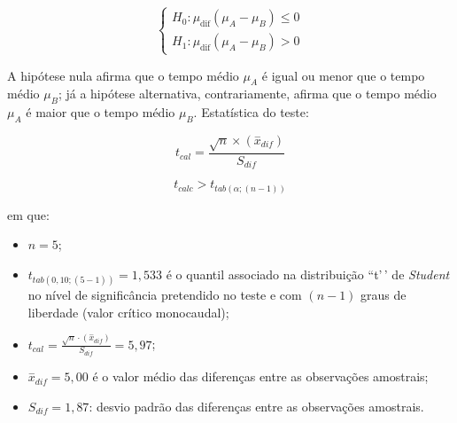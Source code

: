 \documentclass[
]{book}
\providecommand{\tightlist}{%
  \setlength{\itemsep}{0pt}\setlength{\parskip}{0pt}}
\begin{document}
\[
\begin{cases}
        H_{0}:  \mu_{\text{dif}} (\mu_{A} - \mu_{B}) \le 0 \\
        H_{1}:  \mu_{\text{dif}} (\mu_{A} - \mu_{B}) > 0
\end{cases}
\]

\hfill\break

A hipótese nula afirma que o tempo médio \(\mu_{A}\) é igual ou menor que o tempo médio \(\mu_{B}\); já a hipótese alternativa, contrariamente, afirma que o tempo médio \(\mu_{A}\) é maior que o tempo médio \(\mu_{B}\). Estatística do teste:

\hfill\break

\[
t_{cal} = \frac{\sqrt{n} \times \left({\stackrel{-}{x}}_{dif}\right)}{{S}_{dif}}
\]

\hfill\break

\[
t_{calc}  >  {t}_{tab\left(\alpha ; (n-1)\right)}
\]

\hfill\break

em que:

\hfill\break

\begin{itemize}
\tightlist
\item
  \(n=5\);\\
\item
  \({t}_{tab\left(0,10 ; (5-1) \right)} = 1,533\) é o quantil associado na distribuição ``t'\,' de \emph{Student} no nível de significância pretendido no teste e com \((n-1)\) graus de liberdade (valor crítico monocaudal);\\
\item
  \(t_{cal} = \frac{\sqrt{n}\cdot \left({\stackrel{-}{x}}_{dif}\right)}{{S}_{dif}} = 5,97\);\\
\item
  \(\stackrel{-}{x}_{dif} = 5,00\) é o valor médio das diferenças entre as observações amostrais;\\
\item
  \(S_{dif} = 1,87\): desvio padrão das diferenças entre as observações amostrais.
\end{itemize}

\hfill\break
\end{document}
